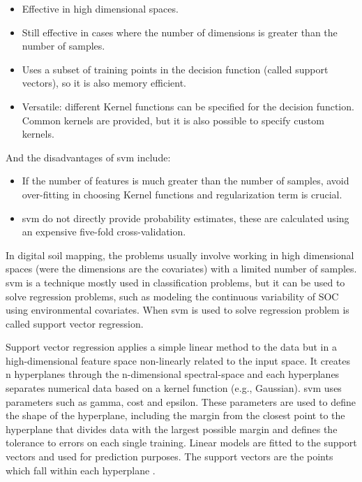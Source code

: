 \documentclass[10pt,b5paper,]{book}
\providecommand{\tightlist}{%
  \setlength{\itemsep}{0pt}\setlength{\parskip}{0pt}}
\theoremstyle{definition}
\theoremstyle{definition}
\theoremstyle{definition}
\theoremstyle{remark}
\begin{document}
\begin{itemize}
\tightlist
\item
  Effective in high dimensional spaces.
\item
  Still effective in cases where the number of dimensions is greater
  than the number of samples.
\item
  Uses a subset of training points in the decision function (called
  support vectors), so it is also memory efficient.
\item
  Versatile: different Kernel functions can be specified for the
  decision function. Common kernels are provided, but it is also
  possible to specify custom kernels.
\end{itemize}

And the disadvantages of svm include:

\begin{itemize}
\tightlist
\item
  If the number of features is much greater than the number of samples,
  avoid over-fitting in choosing Kernel functions and regularization
  term is crucial.
\item
  svm do not directly provide probability estimates, these are
  calculated using an expensive five-fold cross-validation.
\end{itemize}

In digital soil mapping, the problems usually involve working in high
dimensional spaces (were the dimensions are the covariates) with a
limited number of samples. svm is a technique mostly used in
classification problems, but it can be used to solve regression
problems, such as modeling the continuous variability of SOC using
environmental covariates. When svm is used to solve regression problem
is called support vector regression.

Support vector regression applies a simple linear method to the data but
in a high-dimensional feature space non-linearly related to the input
space. It creates n hyperplanes through the n-dimensional spectral-space
and each hyperplanes separates numerical data based on a kernel function
(e.g., Gaussian). svm uses parameters such as gamma, cost and epsilon.
These parameters are used to define the shape of the hyperplane,
including the margin from the closest point to the hyperplane that
divides data with the largest possible margin and defines the tolerance
to errors on each single training. Linear models are fitted to the
support vectors and used for prediction purposes. The support vectors
are the points which fall within each hyperplane \citep{soil-2017-40}.
\end{document}
